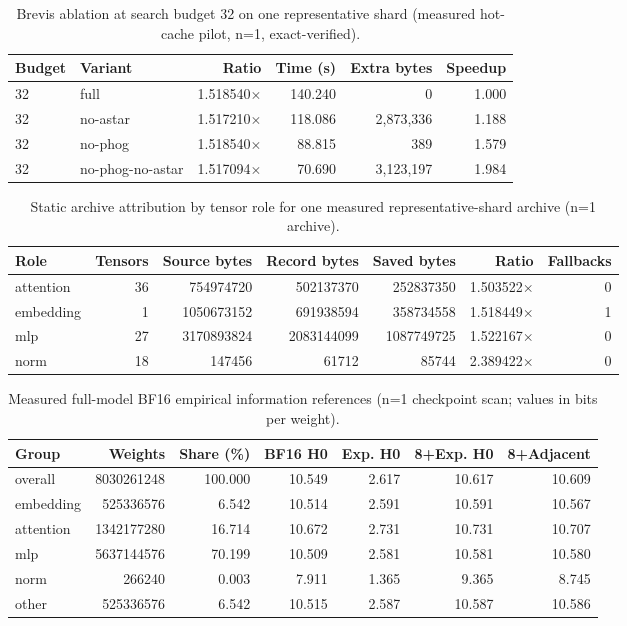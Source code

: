 \begin{table}[t]
\centering
\scriptsize
\begin{tabular}{llrrrr}
\toprule
Budget & Variant & Ratio & Time (s) & Extra bytes & Speedup \\
\midrule
32 & full & 1.518540$\times$ & 140.240 & 0 & 1.000 \\
32 & no-astar & 1.517210$\times$ & 118.086 & 2,873,336 & 1.188 \\
32 & no-phog & 1.518540$\times$ & 88.815 & 389 & 1.579 \\
32 & no-phog-no-astar & 1.517094$\times$ & 70.690 & 3,123,197 & 1.984 \\
\bottomrule
\end{tabular}
\caption{Brevis ablation at search budget 32 on one representative shard (measured hot-cache pilot, n=1, exact-verified).}
\label{tab:brevis-ablation-pilot}
\end{table}

\begin{table}[t]
\centering
\scriptsize
\begin{tabular}{lrrrrrr}
\toprule
Role & Tensors & Source bytes & Record bytes & Saved bytes & Ratio & Fallbacks \\
\midrule
attention & 36 & 754974720 & 502137370 & 252837350 & 1.503522$\times$ & 0 \\
embedding & 1 & 1050673152 & 691938594 & 358734558 & 1.518449$\times$ & 1 \\
mlp & 27 & 3170893824 & 2083144099 & 1087749725 & 1.522167$\times$ & 0 \\
norm & 18 & 147456 & 61712 & 85744 & 2.389422$\times$ & 0 \\
\bottomrule
\end{tabular}
\caption{Static archive attribution by tensor role for one measured representative-shard archive (n=1 archive).}
\label{tab:brevis-attribution}
\end{table}

\begin{table}[t]
\centering
\scriptsize
\begin{tabular}{lrrrrrr}
\toprule
Group & Weights & Share (\%) & BF16 H0 & Exp. H0 & 8+Exp. H0 & 8+Adjacent \\
\midrule
overall & 8030261248 & 100.000 & 10.549 & 2.617 & 10.617 & 10.609 \\
embedding & 525336576 & 6.542 & 10.514 & 2.591 & 10.591 & 10.567 \\
attention & 1342177280 & 16.714 & 10.672 & 2.731 & 10.731 & 10.707 \\
mlp & 5637144576 & 70.199 & 10.509 & 2.581 & 10.581 & 10.580 \\
norm & 266240 & 0.003 & 7.911 & 1.365 & 9.365 & 8.745 \\
other & 525336576 & 6.542 & 10.515 & 2.587 & 10.587 & 10.586 \\
\bottomrule
\end{tabular}
\caption{Measured full-model BF16 empirical information references (n=1 checkpoint scan; values in bits per weight).}
\label{tab:brevis-information}
\end{table}

